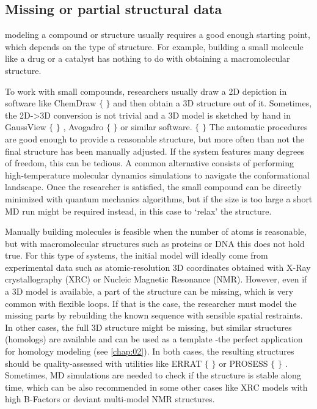 \subsection{Missing or partial structural data}
modeling a compound or structure usually requires a good enough starting point, which depends on the type of structure. For example, building a small molecule like a drug or a catalyst has nothing to do with obtaining a macromolecular structure.

To work with small compounds, researchers usually draw a 2D depiction in software like ChemDraw $ \{ $ $ \} $  and then obtain a 3D structure out of it. Sometimes, the 2D->3D conversion is not trivial and a 3D model is sketched by hand in GaussView $ \{ $ $ \} $ , Avogadro $ \{ $ $ \} $  or similar software. $ \{ $ $ \} $  The automatic procedures are good enough to provide a reasonable structure, but more often than not the final structure has been manually adjusted. If the system features many degrees of freedom, this can be tedious. A common alternative consists of performing high-temperature molecular dynamics simulations to navigate the conformational landscape. Once the researcher is satisfied, the small compound can be directly minimized with quantum mechanics algorithms, but if the size is too large a short MD run might be required instead, in this case to ‘relax’ the structure.

Manually building molecules is feasible when the number of atoms is reasonable, but with macromolecular structures such as proteins or DNA this does not hold true. For this type of systems, the initial model will ideally come from experimental data such as atomic-resolution 3D coordinates obtained with X-Ray crystallography (XRC) or Nucleic Magnetic Resonance (NMR). However, even if a 3D model is available, a part of the structure can be missing, which is very common with flexible loops. If that is the case, the researcher must model the missing parts by rebuilding the known sequence with sensible spatial restraints. In other cases, the full 3D structure might be missing, but similar structures (homologs) are available and can be used as a template -the perfect application for homology modeling (see \autoref{chap:02}). In both cases, the resulting structures should be quality-assessed with utilities like ERRAT $ \{ $ $ \} $  or PROSESS $ \{ $ $ \} $ . Sometimes, MD simulations are needed to check if the structure is stable along time, which can be also recommended in some other cases like XRC models with high B-Factors or deviant multi-model NMR structures.

